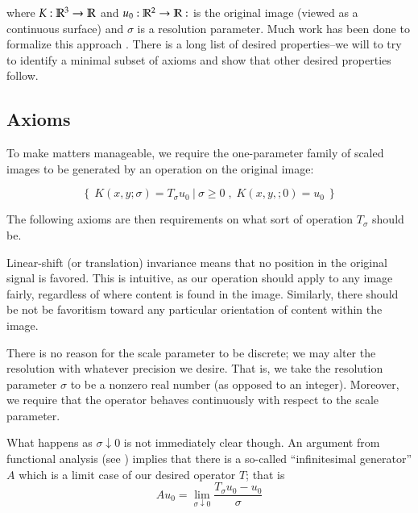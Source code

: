    where $K: \mathbb{R}^3 \to \mathbb{R} $ and  $u_0: \mathbb{R}^2 \to \mathbb{R}: $ is the original image (viewed as a continuous surface) and $\sigma$ is a resolution parameter.
    Much work has been done to formalize this approach \cite{GSST-book}. There is a long list of desired properties--we will to try to identify a minimal subset of axioms and show that other desired properties follow.
    
	  
    
    \subsection{Axioms}
	 To make matters manageable, we require the one-parameter family of scaled images to be generated by an operation on the original image:
	 
	\[
		\left\{\ K(x,y;\sigma) = T_\sigma u_0
		\ \lvert \ 
		\sigma \ge 0
		\; ,\; K(x,y,;0) = u_0
		\ \right\} 
	\]
    
	The following axioms are then requirements on what sort
	of operation $T_\sigma$ should be.
		
    \begin{axiom}
    	\label{axiom:linear-shift-and-rotation}
    Linear-shift (or translation) invariance means that no position in the original signal is favored.  This is intuitive, as our operation should apply to any image fairly, regardless of where content is found in the image. Similarly, there should be not be favoritism toward any particular orientation of content within the image.
\end{axiom}
    
    \begin{axiom}
    	\label{axiom:continuity} There is no reason for the scale parameter to be discrete; we may alter the resolution with whatever
    precision we desire. That is, we take the resolution
    parameter $\sigma$ to be a nonzero real number
    (as opposed to an integer). Moreover, we require that the operator behaves continuously with respect to the scale parameter.
        \end{axiom}
    What happens as $\sigma \downarrow 0$ is not immediately clear though. 	An argument from functional analysis (see \cite{hille1957functional}) implies that there is a so-called ``infinitesimal generator'' $A$
	which is a limit case of our desired operator $T$; that is
	\begin{equation} \label{eq:infinitesimal-generator}
	A u_0 = \lim_{\sigma \downarrow 0} \frac{T_\sigma u_0 - u_0}{\sigma}
	\end{equation}
	 
